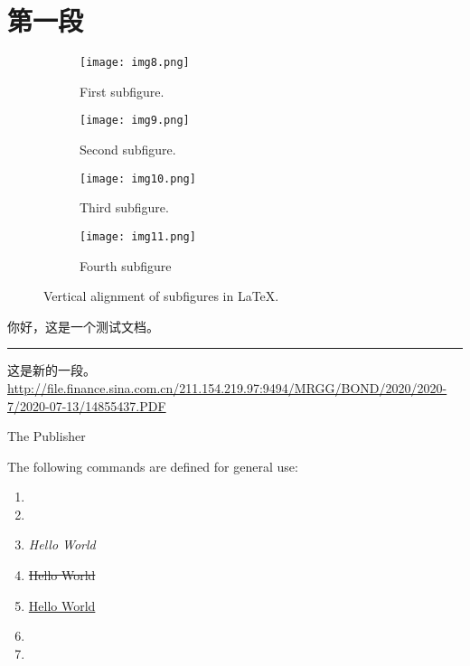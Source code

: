\documentclass[12pt]{ctexart}
\newcommand*{\plogo}{\fbox{$\mathcal{PL}$}} %
\begin{document}
\tableofcontents
\newpage
\section{第一段}
\fangsong 

\begin{figure}
    \centering
    \begin{subfigure}[t]{0.4\textwidth}
        \texttt{[image: img8.png]}
        \caption{First subfigure.}
        \label{fig:first}
    \end{subfigure}
    \hfill
    \begin{subfigure}[t]{0.4\textwidth}
        \texttt{[image: img9.png]}
        \caption{Second subfigure.}
        \label{fig:second}
    \end{subfigure}
    \hfill
    \begin{subfigure}[b]{0.4\textwidth}
        \texttt{[image: img10.png]}
        \caption{Third subfigure.}
        \label{fig:third}
    \end{subfigure}
    \hfill 
    \begin{subfigure}[b]{0.4\textwidth}
        \texttt{[image: img11.png]}
        \caption{Fourth subfigure}
        \label{fig:fourth}
    \end{subfigure}
            
    \caption{Vertical alignment of subfigures in \LaTeX.}
    \label{fig:figures}
\end{figure}    

你好，这是一个测试文档。\par
\rule{1pt}{\textheight} %
\hspace{0.05\textwidth}
\parbox[b]{0.75\textwidth}{
这是新的一段。\url{http://file.finance.sina.com.cn/211.154.219.97:9494/MRGG/BOND/2020/2020-7/2020-07-13/14855437.PDF}
\vspace{0.5\textheight} %
		
{\indent The Publisher~~\plogo}\\[\baselineskip] %
}
\begin{comment}
    \textcolor{red}{This text should NOT be displayed.}
\end{comment}
\begin{mdframed}[style=mdfexample]
    The following commands are defined for general use:\par
    \begin{enumerate}
        \item {}
        \item {}
        \item \emph{Hello World}
        \item \sout{Hello World}
        \item \uline{Hello World}
        \item {}
        \item {}
    \end{enumerate}
\end{mdframed}
\medskip
\zhlipsum[2-4][name=zhufu] 
\end{document}
